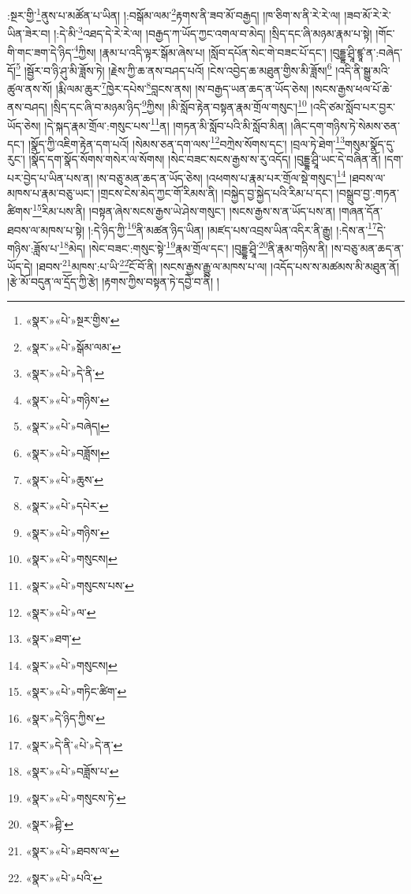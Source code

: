 :སྔར་གྱི་\footnote{«སྣར་»«པེ་»སྔར་གྱིས་}ནུས་པ་མཚོན་པ་ཡིན། །:བསྒོམ་ལམ་\footnote{«སྣར་»«པེ་»སྒོམ་ལམ་}རྟགས་ནི་ཟབ་མོ་བརྒྱད། །ཁ་ཅིག་ས་ནི་རེ་རེ་ལ། །ཟབ་མོ་རེ་རེ་ཡིན་ཟེར་བ། །:དེ་མི་\footnote{«སྣར་»«པེ་»དེ་ནི་}འཐད་དེ་རེ་རེ་ལ། །བརྒྱད་ཀ་ཡོད་ཀྱང་འགལ་བ་མེད། །སྲིད་དང་ཞི་མཉམ་རྣམ་པ་སྟེ། །གོང་གི་གང་ཟག་དེ་ཉིད་\footnote{«སྣར་»«པེ་»གཉིས་}ཀྱིས། །རྣམ་པ་འདི་ལྟར་སྒོམ་ཞེས་པ། །སློབ་དཔོན་སེང་གེ་བཟང་པོ་དང་། །བུདྡྷ་ཤྲཱི་ཛྙཱ་ན་:བཞེད་དོ།\footnote{«སྣར་»«པེ་»བཞེད།} །སྦྱོར་བ་ཉི་ཤུ་མི་ཟློས་ཏེ། །རྗེས་ཀྱི་ཆ་ནས་བཤད་པའོ། །ངེས་འབྱེད་ཆ་མཐུན་གྱིས་མི་ཟློས།\footnote{«སྣར་»«པེ་»བཟློས།} །འདི་ནི་སྒྱུ་མའི་ཚུལ་ནས་སོ། །རྨི་ལམ་ཆུར་\footnote{«སྣར་»«པེ་»ཆུས་}ཁྱེར་དཔེས་\footnote{«སྣར་»«པེ་»དཔེར་}བླངས་ནས། །ས་བརྒྱད་ཡན་ཆད་ན་ཡོད་ཅེས། །སངས་རྒྱས་ཕལ་པོ་ཆེ་ནས་བཤད། །སྲིད་དང་ཞི་བ་མཉམ་ཉིད་\footnote{«སྣར་»«པེ་»གཉིས་}ཀྱིས། །མི་སློབ་རྟེན་བསྟན་རྣམ་གྲོལ་གསུང་།\footnote{«སྣར་»«པེ་»གསུངས།} །འདི་ཙམ་སློབ་པར་བྱར་ཡོད་ཅེས། །དེ་སྐད་རྣམ་གྲོལ་:གསུང་པས་\footnote{«སྣར་»«པེ་»གསུངས་པས་}ན། །གཏན་མི་སློབ་པའི་མི་སློབ་མིན། །ཞིང་དག་གཉིས་ཏེ་སེམས་ཅན་དང་། །སྣོད་ཀྱི་འཇིག་རྟེན་དག་པའོ། །སེམས་ཅན་དག་ལས་\footnote{«སྣར་»«པེ་»ལ་}བཀྲེས་སོགས་དང་། །བྲལ་ཏེ་ཐེག་\footnote{«སྣར་»ཐག་}གསུམ་སྣོད་དུ་རུང་། །སྣོད་དག་སྣོད་སོགས་གསེར་ལ་སོགས། །སེང་བཟང་སངས་རྒྱས་ས་རུ་འདོད། །བུདྡྷ་ཤྲཱི་ཡང་དེ་བཞིན་ནོ། །དག་པར་བྱེད་པ་ཡིན་པས་ན། །ས་བཅུ་མན་ཆད་ན་ཡོད་ཅེས། །འཕགས་པ་རྣམ་པར་གྲོལ་སྡེ་གསུང་།\footnote{«སྣར་»«པེ་»གསུངས།} །ཐབས་ལ་མཁས་པ་རྣམ་བཅུ་ཡང་། །གྲངས་ངེས་མེད་ཀྱང་གོ་རིམས་ནི། །བསྐྱེད་བྱ་སྐྱེད་པའི་རིམ་པ་དང་། །བསྒྲུབ་བྱ་:གཏན་ཚིགས་\footnote{«སྣར་»«པེ་»གཏིང་ཚིག་}རིམ་པས་ནི། །བསྟན་ཞེས་སངས་རྒྱས་ཡེ་ཤེས་གསུང་། །སངས་རྒྱས་ས་ན་ཡོད་པས་ན། །གཞན་དོན་ཐབས་ལ་མཁས་པ་སྟེ། །:དེ་ཉིད་ཀྱི་\footnote{«སྣར་»དེ་ཉིད་ཀྱིས་}ནི་མཚན་ཉིད་ཡིན། །མཛད་པས་འབྲས་ཡིན་འདིར་ནི་རྒྱུ། །:དེས་ན་\footnote{«སྣར་»དེ་ནི་«པེ་»དེ་ན་}དེ་གཉིས་:ཟློས་པ་\footnote{«སྣར་»«པེ་»བཟློས་པ་}མེད། །སེང་བཟང་:གསུང་སྟེ་\footnote{«སྣར་»«པེ་»གསུངས་ཏེ་}རྣམ་གྲོལ་དང་། །བུདྡྷ་ཤྲཱི་\footnote{«སྣར་»ཤྟི་}ནི་རྣམ་གཉིས་ནི། །ས་བཅུ་མན་ཆད་ན་ཡོད་དེ། །ཐབས་\footnote{«སྣར་»«པེ་»ཐབས་ལ་}མཁས་:པ་ཡི་\footnote{«སྣར་»«པེ་»པའི་}ངོ་བོ་ནི། །སངས་རྒྱས་རྒྱུ་ལ་མཁས་པ་ལ། །འདོད་པས་ས་མཚམས་མི་མཐུན་ནོ། །རྩེ་མོ་བདུན་ལ་དྲོད་ཀྱི་རྩེ། །རྟགས་ཀྱིས་བསྟན་ཏེ་དབྱེ་བ་ནི། །
